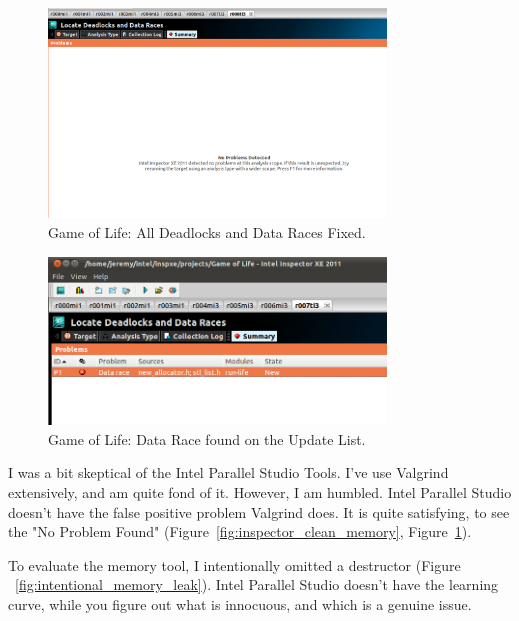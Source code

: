 \documentclass[10pt]{article}
\begin{document}
\begin{appendices}
\begin{figure}[h]
\begin{center}
\includegraphics[width=0.8\textwidth]{figures/ChangeSet14.png}
\caption{Game of Life: All Deadlocks and Data Races Fixed.}
\label{fig:inspector_clean_deadlocks}
\end{center}
\end{figure}

\begin{figure}[h]
\begin{center}
\includegraphics[width=0.8\textwidth]{figures/Data_Race_Anaylsis.png}
\caption{Game of Life: Data Race found on the Update List.}
\label{fig:inspector_data_race_allocator}
\end{center}
\end{figure}




I was a bit skeptical of the Intel Parallel Studio Tools. I've use Valgrind extensively, and am quite
fond of it. However, I am humbled. Intel Parallel Studio doesn't have the false positive problem
Valgrind does. It is quite satisfying, to see the "No Problem Found" (Figure~\ref{fig:inspector_clean_memory},
Figure~\ref{fig:inspector_clean_deadlocks}).

To evaluate the memory tool, I intentionally omitted a destructor (Figure ~\ref{fig:intentional_memory_leak}).
Intel Parallel Studio doesn't have the learning curve, while you figure out what is innocuous, and which is 
a genuine issue.


\end{appendices}
\end{document}
